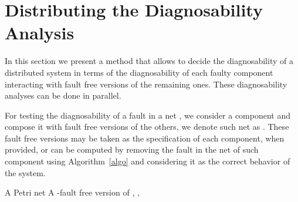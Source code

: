\documentclass[a4paper]{article}
\begin{document}
\section{Distributing the Diagnosability Analysis} \label{sec:DDA}

In this section we present a method that allows to decide the diagnosability of a distributed system in terms of the diagnosability of each faulty component interacting with fault free versions of the remaining ones. These diagnosability analyses can be done in parallel.

For testing the diagnosability of a fault  in a net , we consider a component  and compose it with fault free versions of the others, we denote such net as . These fault free versions may be taken as the specification of each component, when provided, or can be computed by removing the fault  in the net of such component using Algorithm~\ref{algo} and considering it as the correct behavior of the system.

\begin{algorithm}[h]
\caption{}
  \begin{algorithmic}[1] \label{algo1}
    \REQUIRE A Petri net 
    \ENSURE A -fault free version of 
      \STATE  ,  , 
      \WHILE{}
        \IF{}
          \STATE 
          \STATE 
        \ENDIF
        \STATE 
      \ENDWHILE
    \STATE 
    \STATE 
    \RETURN 
  \end{algorithmic}
  \label{algo}
\end{algorithm}
\end{document}
